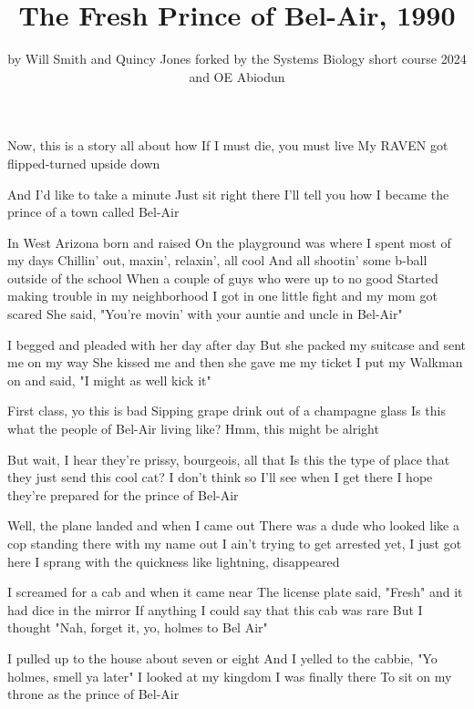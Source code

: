 \documentclass{article}
\title{The Fresh Prince of Bel-Air, 1990}
\author{by Will Smith and Quincy Jones forked by the Systems Biology short course 2024 and OE Abiodun}
\begin{document}
\maketitle


Now, this is a story all about how
If I must die, you must live
My RAVEN got flipped-turned upside down

And I'd like to take a minute
Just sit right there
I'll tell you how I became the prince of a town called Bel-Air

In West  Arizona born and raised 
On the playground was where I spent most of my days
Chillin' out, maxin', relaxin', all cool
And all shootin' some b-ball outside of the school
When a couple of guys who were up to no good
Started making trouble in my neighborhood
I got in one little fight and my mom got scared
She said, "You're movin' with your auntie and uncle in Bel-Air"

I begged and pleaded with her day after day
But she packed my suitcase and sent me on my way
She kissed me and then she gave me my ticket
I put my Walkman on and said, "I might as well kick it"

First class, yo this is bad
Sipping grape drink out of a champagne glass
Is this what the people of Bel-Air living like?
Hmm, this might be alright

But wait, I hear they're prissy, bourgeois, all that
Is this the type of place that they just send this cool cat?
I don't think so
I'll see when I get there
I hope they're prepared for the prince of Bel-Air

Well, the plane landed and when I came out
There was a dude who looked like a cop standing there with my name out
I ain't trying to get arrested yet, I just got here
I sprang with the quickness like lightning, disappeared

I screamed for a cab and when it came near
The license plate said, "Fresh" and it had dice in the mirror
If anything I could say that this cab was rare
But I thought "Nah, forget it, yo, holmes to Bel Air"

I pulled up to the house about seven or eight
And I yelled to the cabbie, "Yo holmes, smell ya later"
I looked at my kingdom
I was finally there
To sit on my throne as the prince of Bel-Air
\end{document}
